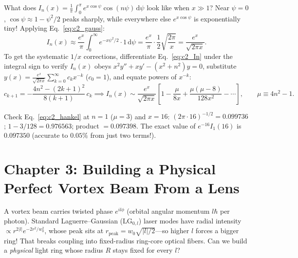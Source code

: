 \documentclass[10pt,letterpaper]{article}
\newcommand{\abs}[1]{\lvert #1 \rvert}
\newcommand{\dd}{\mathrm{d}}
\numberwithin{equation}{section}
\begin{document}
What does $I_n(x) = \frac{1}{\pi}\int_0^\pi e^{x\cos\psi}\cos(n\psi)\,\dd\psi$ look like when $x \gg 1$? Near $\psi = 0$, $\cos\psi \approx 1 - \psi^2/2$ peaks sharply, while everywhere else $e^{x\cos\psi}$ is exponentially tiny! Applying Eq.~\eqref{eq:c2_gauss}:
\begin{equation}
  I_n(x) \approx \frac{e^x}{\pi}\int_0^\infty e^{-x\psi^2/2}\cdot 1\,\dd\psi = \frac{e^x}{\pi}\cdot\frac{1}{2}\sqrt{\frac{2\pi}{x}} = \frac{e^x}{\sqrt{2\pi x}}.
\end{equation}
To get the systematic $1/x$ corrections, differentiate Eq.~\eqref{eq:c2_In} under the integral sign to verify $I_n(x)$ obeys $x^2 y'' + x y' - (x^2+n^2)y = 0$, substitute $y(x) = \frac{e^x}{\sqrt{2\pi x}}\sum_{k=0}^\infty c_k x^{-k}$ ($c_0 = 1$), and equate powers of $x^{-k}$:
\begin{equation}
  c_{k+1} = -\frac{4n^2 - (2k+1)^2}{8(k+1)}\,c_k
  \implies I_n(x) \sim \frac{e^x}{\sqrt{2\pi x}}\left[1 - \frac{\mu}{8x} + \frac{\mu(\mu-8)}{128 x^2} - \cdots\right], \qquad \mu \equiv 4n^2 - 1.
  \label{eq:c2_hankel}
\end{equation}

\begin{pencilbox}
Check Eq.~\eqref{eq:c2_hankel} at $n = 1$ ($\mu = 3$) and $x = 16$: $(2\pi\cdot 16)^{-1/2} = 0.099736$; $1 - 3/128 = 0.976563$; product $= 0.097398$. The exact value of $e^{-16}I_1(16)$ is $0.097350$ (accurate to $0.05\%$ from just two terms!).
\end{pencilbox}

\section{Chapter 3: Building a Physical Perfect Vortex Beam From a Lens}
\label{sec:c3}

\begin{whystep}
A vortex beam carries twisted phase $e^{il\phi}$ (orbital angular momentum $l\hbar$ per photon). Standard Laguerre--Gaussian ($\mathrm{LG}_{0,l}$) laser modes have radial intensity $\propto r^{2\abs{l}} e^{-2r^2/w_0^2}$, whose peak sits at $r_{\mathrm{peak}} = w_0\sqrt{\abs{l}/2}$---so higher $l$ forces a bigger ring! That breaks coupling into fixed-radius ring-core optical fibers. Can we build a \emph{physical} light ring whose radius $R$ stays fixed for every $l$?
\end{whystep}
\end{document}
